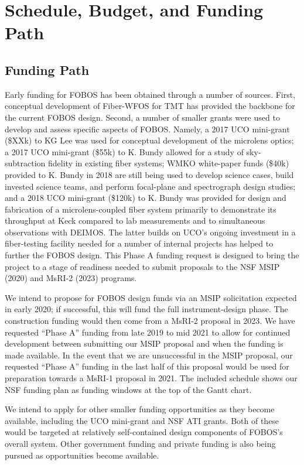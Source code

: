 
\section{Schedule, Budget, and Funding Path}
\label{sec:budget}

\subsection{Funding Path}

Early funding for FOBOS has been obtained through a number of
sources. First, conceptual development of Fiber-WFOS for TMT has
provided the backbone for the current FOBOS design. Second, a number
of smaller grants were used to develop and assess specific aspects of
FOBOS. Namely, a 2017 UCO mini-grant (\$XXk) to KG Lee was used for
conceptual development of the microlens optics; a 2017 UCO mini-grant
(\$55k) to K. Bundy allowed for a study of sky-subtraction fidelity
in existing fiber systems; WMKO white-paper funds (\$40k) provided to
K. Bundy in 2018 are still being used to develop science cases, build
invested science teams, and perform focal-plane and spectrograph
design studies; and a 2018 UCO mini-grant (\$120k) to K. Bundy was
provided for design and fabrication of a microlens-coupled fiber
system primarily to demonstrate its throughput at Keck compared to
lab measurements and to simultaneous observations with DEIMOS. The
latter builds on UCO's ongoing investment in a fiber-testing facility
needed for a number of internal projects has helped to further the
FOBOS design. This Phase A funding request is designed to bring the
project to a stage of readiness needed to submit proposals to the NSF
MSIP (2020) and MsRI-2 (2023) programs.

We intend to propose for FOBOS design funds via an MSIP solicitation
expected in early 2020; if successful, this will fund the full
instrument-design phase. The construction funding would then come
from a MsRI-2 proposal in 2023. We have requested ``Phase A'' funding
from late 2019 to mid 2021 to allow for continued development between
submitting our MSIP proposal and when the funding is made available.
In the event that we are unsuccessful in the MSIP proposal, our
requested ``Phase A'' funding in the last half of this proposal would
be used for preparation towards a MsRI-1 proposal in 2021. The
included schedule shows our NSF funding plan as funding windows at
the top of the Gantt chart.

We intend to apply for other smaller funding opportunities as they
become available, including the UCO mini-grant and NSF ATI grants.
Both of these would be targeted at relatively self-contained design
components of FOBOS's overall system. Other government funding and
private funding is also being pursued as opportunities become
available.

